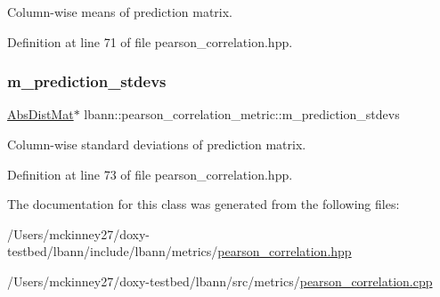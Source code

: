 Column-\/wise means of prediction matrix. 

Definition at line 71 of file pearson\+\_\+correlation.\+hpp.

\mbox{\label{classlbann_1_1pearson__correlation__metric_ad288c4206078866feb39a4f982d8e975}} 
\subsubsection{\texorpdfstring{m\+\_\+prediction\+\_\+stdevs}{m\_prediction\_stdevs}}
{\footnotesize\ttfamily \hyperlink{base_8hpp_a9a697a504ae84010e7439ffec862b470}{Abs\+Dist\+Mat}$\ast$ lbann\+::pearson\+\_\+correlation\+\_\+metric\+::m\+\_\+prediction\+\_\+stdevs\hspace{0.3cm}{\ttfamily [private]}}

Column-\/wise standard deviations of prediction matrix. 

Definition at line 73 of file pearson\+\_\+correlation.\+hpp.



The documentation for this class was generated from the following files\+:\begin{DoxyCompactItemize}
\item 
/\+Users/mckinney27/doxy-\/testbed/lbann/include/lbann/metrics/\hyperlink{pearson__correlation_8hpp}{pearson\+\_\+correlation.\+hpp}\item 
/\+Users/mckinney27/doxy-\/testbed/lbann/src/metrics/\hyperlink{pearson__correlation_8cpp}{pearson\+\_\+correlation.\+cpp}\end{DoxyCompactItemize}
